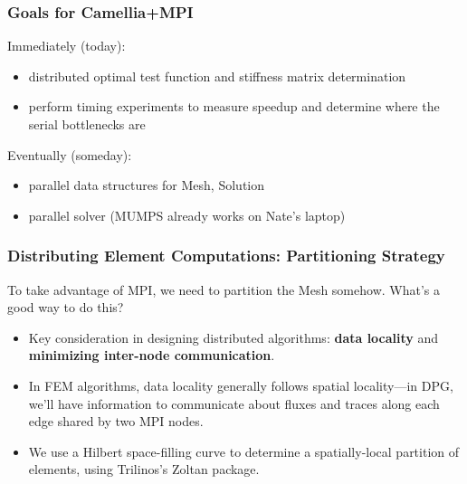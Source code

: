 \documentclass[mathserif]{beamer}
\begin{document}
\begin{frame}
\frametitle{Goals for Camellia+MPI}
Immediately (today):
\begin{itemize}
\item distributed optimal test function and stiffness matrix determination
\item perform timing experiments to measure speedup and determine where the serial bottlenecks are
\end{itemize}
Eventually (someday):
\begin{itemize}
\item parallel data structures for Mesh, Solution
\item parallel solver (MUMPS already works on Nate's laptop)
\end{itemize}
\end{frame}

\begin{frame}
\frametitle{Distributing Element Computations: Partitioning Strategy}
To take advantage of MPI, we need to partition the Mesh somehow.  What's a good way to do this?
\begin{itemize}
\item Key consideration in designing distributed algorithms: {\bf data locality} and {\bf minimizing inter-node communication}.
\item In FEM algorithms, data locality generally follows spatial locality---in DPG, we'll have information to communicate about fluxes and traces along each edge shared by two MPI nodes.
\item We use a Hilbert space-filling curve to determine a spatially-local partition of elements, using Trilinos's Zoltan package.
\end{itemize}
\end{frame}
\end{document}
